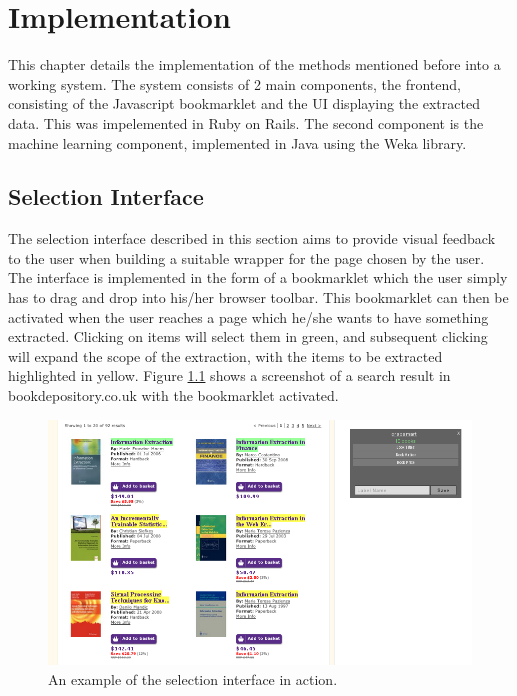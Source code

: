 \chapter{Implementation}

This chapter details the implementation of the methods mentioned before into a working system. The system consists of 2 main components, the frontend, consisting of the Javascript bookmarklet and the UI displaying the extracted data. This was impelemented in Ruby on Rails. The second component is the machine learning component, implemented in Java using the Weka library.


\section{Selection Interface}
\label{chap:selection}

The selection interface described in this section aims to provide visual feedback to the user when building a suitable wrapper for the page chosen by the user. The interface is implemented in the form of a bookmarklet which the user simply has to drag and drop into his/her browser toolbar. This bookmarklet can then be activated when the user reaches a page which he/she wants to have something extracted. Clicking on items will select them in green, and subsequent clicking will expand the scope of the extraction, with the items to be extracted highlighted in yellow. Figure \ref{fig:selection_example} shows a screenshot of a search result in bookdepository.co.uk with the bookmarklet activated.

\begin{figure}[htbp]
\centering
\includegraphics[scale=0.43]{selection_example.png} 
\caption{An example of the selection interface in action.}
\label{fig:selection_example}
\end{figure}


